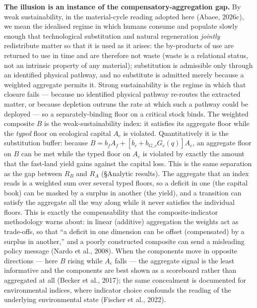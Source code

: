 \documentclass[11pt]{article}
\begin{document}
\noindent\textbf{The illusion is an instance of the compensatory-aggregation gap.} By weak sustainability, in the material-cycle reading adopted here (Abaee, 2026c), we mean the idealised regime in which humans consume and populate slowly enough that technological substitution and natural regeneration \emph{jointly} redistribute matter so that it is used as it arises: the by-products of use are returned to use in time and are therefore not waste (waste is a relational status, not an intrinsic property of any material); substitution is admissible only through an identified physical pathway, and no substitute is admitted merely because a weighted aggregate permits it. Strong sustainability is the regime in which that closure fails --- because no identified physical pathway re-routes the extracted matter, or because depletion outruns the rate at which such a pathway could be deployed --- so a separately-binding floor on a critical stock binds. The weighted composite $B$ is the weak-sustainability index: it satisfies its aggregate floor while the \emph{typed} floor on ecological capital $A_c$ is violated. Quantitatively it is the substitution buffer: because $B=b_fA_f+[b_c+b_{G,c}G_c(q)]A_c$, an aggregate floor on $B$ can be met while the typed floor on $A_c$ is violated by exactly the amount that the fast-land yield gains against the capital loss. This is the same separation as the gap between $R_B$ and $R_A$ (\S Analytic results). The aggregate that an index reads is a weighted sum over several typed floors, so a deficit in one (the capital book) can be masked by a surplus in another (the yield), and a transition can satisfy the aggregate all the way along while it never satisfies the individual floors. This is exactly the compensability that the composite-indicator methodology warns about: in linear (additive) aggregation the weights act as trade-offs, so that ``a deficit in one dimension can be offset (compensated) by a surplus in another,'' and a poorly constructed composite can send a misleading policy message (Nardo et al., 2008). When the components move in opposite directions --- here $B$ rising while $A_c$ falls --- the aggregate signal is the least informative and the components are best shown as a scoreboard rather than aggregated at all (Becker et al., 2017); the same concealment is documented for environmental indices, where indicator choice confounds the reading of the underlying environmental state (Fischer et al., 2022).
\end{document}
